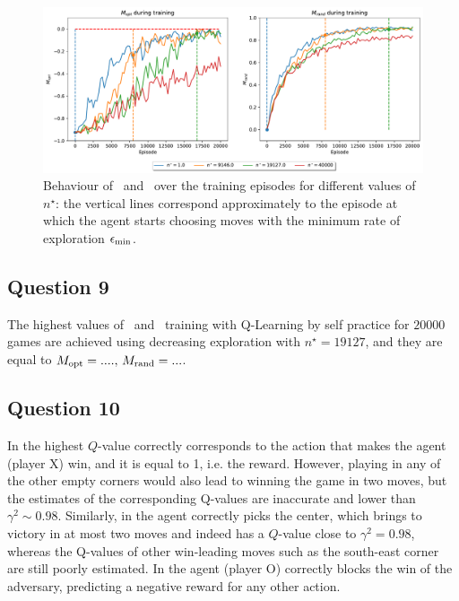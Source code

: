 \documentclass[10pt]{IEEEtran}
\begin{document}
\begin{figure}[h]
    \centering
    \includegraphics[width=\linewidth]{code/figures/performance_n_star_self.pdf}
    \caption{Behaviour of \mopt\ and \mrand\ over the training episodes for different values of $n^{\star}$:  the vertical lines correspond approximately to the episode at which the agent starts choosing moves with the minimum rate of exploration $\epsilon_{\text{min}}$.}
    \label{plot_question8}
\end{figure}



\subsection*{Question 9}
The highest values of \mopt\  and \mrand\  training with Q-Learning by self practice for $20000$ games are achieved using decreasing exploration with $n^{\star} = 19127$, and they are equal to \textcolor{red}{$M_{\text{opt}} = ...., \, M_{\text{rand}} = ...$}.

\subsection*{Question 10}
In  the highest $Q$-value correctly corresponds to the action that makes the agent (player X) win, and it is equal to 1, i.e. the reward. However, playing in any of the other empty corners would also lead to winning the game in two moves, but the estimates of the corresponding Q-values are inaccurate and lower than $\gamma^2 \sim 0.98$. Similarly, in  the agent correctly picks the center, which brings to victory in at most two moves and indeed has a $Q$-value close to $\gamma^2 = 0.98$, whereas the Q-values of other win-leading moves such as the south-east corner are still poorly estimated. In  the agent (player O) correctly blocks the win of the adversary, predicting a negative reward for any other action.
\end{document}
